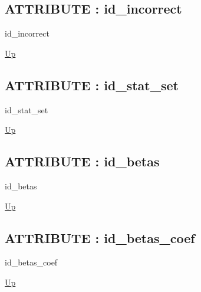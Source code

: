 \par
\par
\subsection*{ATTRIBUTE : id\_incorrect}
\hypertarget{ecldoc:logisticregression.constants.id_incorrect}{}
\begin{minipage}[t]{\textwidth}
\begin{flushleft}
 id\_incorrect 
\end{flushleft}
\end{minipage}
\hyperlink{ecldoc:LogisticRegression.Constants}{Up}

\par
\par
\subsection*{ATTRIBUTE : id\_stat\_set}
\hypertarget{ecldoc:logisticregression.constants.id_stat_set}{}
\begin{minipage}[t]{\textwidth}
\begin{flushleft}
 id\_stat\_set 
\end{flushleft}
\end{minipage}
\hyperlink{ecldoc:LogisticRegression.Constants}{Up}

\par
\par
\subsection*{ATTRIBUTE : id\_betas}
\hypertarget{ecldoc:logisticregression.constants.id_betas}{}
\begin{minipage}[t]{\textwidth}
\begin{flushleft}
 id\_betas 
\end{flushleft}
\end{minipage}
\hyperlink{ecldoc:LogisticRegression.Constants}{Up}

\par
\par
\subsection*{ATTRIBUTE : id\_betas\_coef}
\hypertarget{ecldoc:logisticregression.constants.id_betas_coef}{}
\begin{minipage}[t]{\textwidth}
\begin{flushleft}
 id\_betas\_coef 
\end{flushleft}
\end{minipage}
\hyperlink{ecldoc:LogisticRegression.Constants}{Up}

